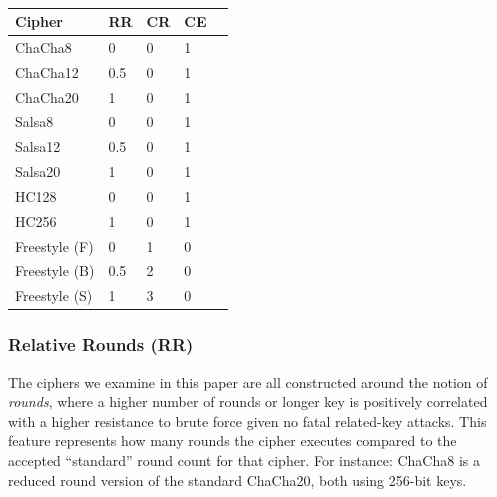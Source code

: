 \begin{table}[ht]
   \begin{tabular}{@{}lllll@{}}
   \toprule
   \textbf{Cipher} & \textbf{RR} & \textbf{CR} & \textbf{CE} \\ \midrule
   ChaCha8         & 0           & 0           & 1           \\
   ChaCha12        & 0.5         & 0           & 1           \\
   ChaCha20        & 1           & 0           & 1           \\
   Salsa8          & 0           & 0           & 1           \\
   Salsa12         & 0.5         & 0           & 1           \\
   Salsa20         & 1           & 0           & 1           \\
   HC128           & 0           & 0           & 1           \\
   HC256           & 1           & 0           & 1           \\
   Freestyle (F)   & 0           & 1           & 0           \\
   Freestyle (B)   & 0.5         & 2           & 0           \\
   Freestyle (S)   & 1           & 3           & 0           \\
\end{tabular}
   \caption{}
   \label{tbl:sc-security-quant}
 \end{table}

\subsubsection{Relative Rounds (RR)}

The ciphers we examine in this paper are all constructed around the notion of
\emph{rounds}, where a higher number of rounds or longer key is positively
correlated with a higher resistance to brute force given no fatal related-key
attacks. This feature represents how many rounds the cipher executes compared to
the accepted ``standard'' round count for that cipher. For instance: ChaCha8 is
a reduced round version of the standard ChaCha20, both using 256-bit keys.


